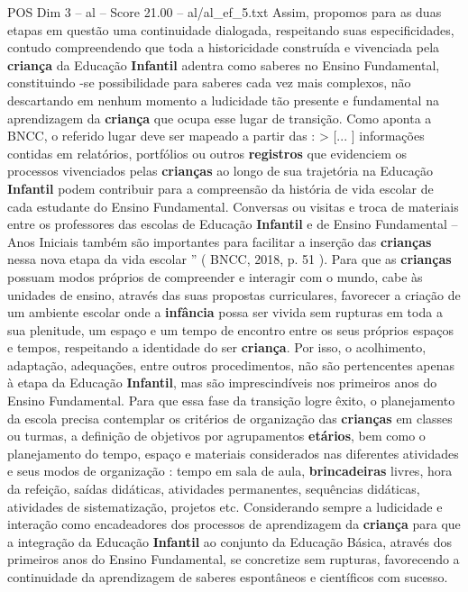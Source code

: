 \begin{textsample}{POS Dim 3 – al – Score 21.00 – al/al\_ef\_5.txt}
Assim, propomos para as duas etapas em questão uma continuidade dialogada, respeitando suas especificidades, contudo compreendendo que toda a historicidade construída e vivenciada pela \textbf{criança} da Educação \textbf{Infantil} adentra como saberes no Ensino Fundamental, constituindo -se possibilidade para saberes cada vez mais complexos, não descartando em nenhum momento a ludicidade tão presente e fundamental na aprendizagem da \textbf{criança} que ocupa esse lugar de transição.
Como aponta a BNCC, o referido lugar deve ser mapeado a partir das : > [... ] informações contidas em relatórios, portfólios ou outros \textbf{registros} que evidenciem os processos vivenciados pelas \textbf{crianças} ao longo de sua trajetória na Educação \textbf{Infantil} podem contribuir para a compreensão da história de vida escolar de cada estudante do Ensino Fundamental.
Conversas ou visitas e troca de materiais entre os professores das escolas de Educação \textbf{Infantil} e de Ensino Fundamental – Anos Iniciais também são importantes para facilitar a inserção das \textbf{crianças} nessa nova etapa da vida escolar ” ( BNCC, 2018, p. 51 ).
Para que as \textbf{crianças} possuam modos próprios de compreender e interagir com o mundo, cabe às unidades de ensino, através das suas propostas curriculares, favorecer a criação de um ambiente escolar onde a \textbf{infância} possa ser vivida sem rupturas em toda a sua plenitude, um espaço e um tempo de encontro entre os seus próprios espaços e tempos, respeitando a identidade do ser \textbf{criança}.
Por isso, o acolhimento, adaptação, adequações, entre outros procedimentos, não são pertencentes apenas à etapa da Educação \textbf{Infantil}, mas são imprescindíveis nos primeiros anos do Ensino Fundamental.
Para que essa fase da transição logre êxito, o planejamento da escola precisa contemplar os critérios de organização das \textbf{crianças} em classes ou turmas, a definição de objetivos por agrupamentos \textbf{etários}, bem como o planejamento do tempo, espaço e materiais considerados nas diferentes atividades e seus modos de organização : tempo em sala de aula, \textbf{brincadeiras} livres, hora da refeição, saídas didáticas, atividades permanentes, sequências didáticas, atividades de sistematização, projetos etc.
Considerando sempre a ludicidade e interação como encadeadores dos processos de aprendizagem da \textbf{criança} para que a integração da Educação \textbf{Infantil} ao conjunto da Educação Básica, através dos primeiros anos do Ensino Fundamental, se concretize sem rupturas, favorecendo a continuidade da aprendizagem de saberes espontâneos e científicos com sucesso.

\end{textsample}
